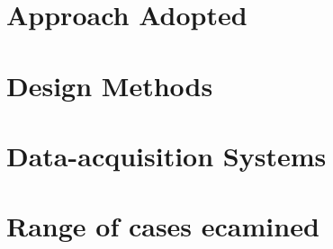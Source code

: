 \section{Approach Adopted}

\section{Design Methods}
\section{Data-acquisition Systems}
\section{Range of cases ecamined}